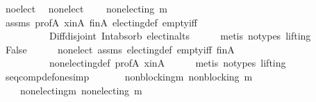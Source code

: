 \begin{isabellebody}
\ no{\isacharunderscore}{\kern0pt}elect\ \isamarkupfalse%
\ non{\isacharunderscore}{\kern0pt}elect{\isacharcolon}{\kern0pt}\isanewline
\ \ \ \ {\isachardoublequoteopen}non{\isacharunderscore}{\kern0pt}electing\ m{\isachardoublequoteclose}\isanewline
\ \ \ \ \isamarkupfalse%
\ assms\ prof{\isacharunderscore}{\kern0pt}A\ x{\isacharunderscore}{\kern0pt}in{\isacharunderscore}{\kern0pt}A\ fin{\isacharunderscore}{\kern0pt}A\ electing{\isacharunderscore}{\kern0pt}def\ empty{\isacharunderscore}{\kern0pt}iff\isanewline
\ \ \ \ \ \ \ \ \ \ Diff{\isacharunderscore}{\kern0pt}disjoint\ Int{\isacharunderscore}{\kern0pt}absorb{}\ elect{\isacharunderscore}{\kern0pt}in{\isacharunderscore}{\kern0pt}alts\isanewline
\ \ \ \ \isamarkupfalse%
\ {\isacharparenleft}{\kern0pt}metis\ {\isacharparenleft}{\kern0pt}no{\isacharunderscore}{\kern0pt}types{\isacharcomma}{\kern0pt}\ lifting{\isacharparenright}{\kern0pt}{\isacharparenright}{\kern0pt}\isanewline
\ \ \isamarkupfalse%
\ {\isachardoublequoteopen}False{\isachardoublequoteclose}\isanewline
\ \ \ \ \isamarkupfalse%
\ non{\isacharunderscore}{\kern0pt}elect\ assms\ electing{\isacharunderscore}{\kern0pt}def\ empty{\isacharunderscore}{\kern0pt}iff\ fin{\isacharunderscore}{\kern0pt}A\isanewline
\ \ \ \ \ \ \ \ \ \ non{\isacharunderscore}{\kern0pt}electing{\isacharunderscore}{\kern0pt}def\ prof{\isacharunderscore}{\kern0pt}A\ x{\isacharunderscore}{\kern0pt}in{\isacharunderscore}{\kern0pt}A\isanewline
\ \ \ \ \isamarkupfalse%
\ {\isacharparenleft}{\kern0pt}metis\ {\isacharparenleft}{\kern0pt}no{\isacharunderscore}{\kern0pt}types{\isacharcomma}{\kern0pt}\ lifting{\isacharparenright}{\kern0pt}{\isacharparenright}{\kern0pt}\isanewline
{}\isamarkupfalse%
%
\endisatagproof
{\isafoldproof}%
%
\isadelimproof
\isanewline
%
\endisadelimproof
\isanewline
\isanewline
{}\isamarkupfalse%
\ seq{\isacharunderscore}{\kern0pt}comp{\isacharunderscore}{\kern0pt}def{\isacharunderscore}{\kern0pt}one{\isacharbrackleft}{\kern0pt}simp{\isacharbrackright}{\kern0pt}{\isacharcolon}{\kern0pt}\isanewline
\ \ \isanewline
\ \ \ \ non{\isacharunderscore}{\kern0pt}blocking{\isacharunderscore}{\kern0pt}m{\isacharcolon}{\kern0pt}\ {\isachardoublequoteopen}non{\isacharunderscore}{\kern0pt}blocking\ m{\isachardoublequoteclose}\ \isanewline
\ \ \ \ non{\isacharunderscore}{\kern0pt}electing{\isacharunderscore}{\kern0pt}m{\isacharcolon}{\kern0pt}\ {\isachardoublequoteopen}non{\isacharunderscore}{\kern0pt}electing\ m{\isachardoublequoteclose}\ \isanewline

\end{isabellebody}
